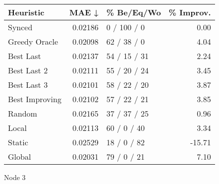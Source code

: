\begin{tabular}{lrlr}
\toprule
\textbf{Heuristic} & \textbf{MAE ↓} & \textbf{\% Be/Eq/Wo} & \textbf{\% Improv.} \\
\midrule
            Synced &        0.02186 &          0 / 100 / 0 &                0.00 \\
     Greedy Oracle &        0.02098 &          62 / 38 / 0 &                4.04 \\
         Best Last &        0.02137 &         54 / 15 / 31 &                2.24 \\
       Best Last 2 &        0.02111 &         55 / 20 / 24 &                3.45 \\
       Best Last 3 &        0.02101 &         58 / 22 / 20 &                3.87 \\
    Best Improving &        0.02102 &         57 / 22 / 21 &                3.85 \\
            Random &        0.02165 &         37 / 37 / 25 &                0.96 \\
             Local &        0.02113 &          60 / 0 / 40 &                3.34 \\
            Static &        0.02529 &          18 / 0 / 82 &              -15.71 \\
            Global &        0.02031 &          79 / 0 / 21 &                7.10 \\
\bottomrule
\end{tabular}
\caption{Node 3}
\label{tab:iid_lr01_le1_bs4_3}
